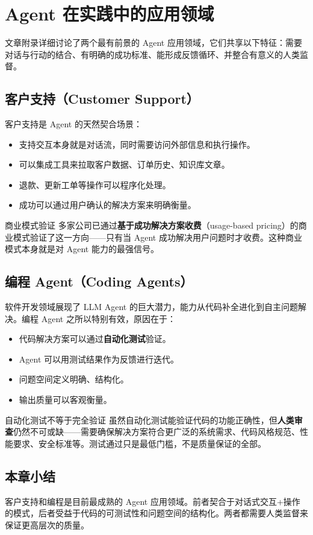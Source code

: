 \section{Agent 在实践中的应用领域}

文章附录详细讨论了两个最有前景的 Agent 应用领域，它们共享以下特征：需要对话与行动的结合、有明确的成功标准、能形成反馈循环、并整合有意义的人类监督。

\subsection{客户支持（Customer Support）}

客户支持是 Agent 的天然契合场景：

\begin{itemize}
    \item 支持交互本身就是对话流，同时需要访问外部信息和执行操作。
    \item 可以集成工具来拉取客户数据、订单历史、知识库文章。
    \item 退款、更新工单等操作可以程序化处理。
    \item 成功可以通过用户确认的解决方案来明确衡量。
\end{itemize}

\begin{knowledgebox}{商业模式验证}
多家公司已通过\textbf{基于成功解决方案收费}（usage-based pricing）的商业模式验证了这一方向——只有当 Agent 成功解决用户问题时才收费。这种商业模式本身就是对 Agent 能力的最强信号。
\end{knowledgebox}

\subsection{编程 Agent（Coding Agents）}

软件开发领域展现了 LLM Agent 的巨大潜力，能力从代码补全进化到自主问题解决。编程 Agent 之所以特别有效，原因在于：

\begin{itemize}
    \item 代码解决方案可以通过\textbf{自动化测试}验证。
    \item Agent 可以用测试结果作为反馈进行迭代。
    \item 问题空间定义明确、结构化。
    \item 输出质量可以客观衡量。
\end{itemize}

\begin{warningbox}{自动化测试不等于完全验证}
虽然自动化测试能验证代码的功能正确性，但\textbf{人类审查}仍然不可或缺——需要确保解决方案符合更广泛的系统需求、代码风格规范、性能要求、安全标准等。测试通过只是最低门槛，不是质量保证的全部。
\end{warningbox}

\subsection{本章小结}
客户支持和编程是目前最成熟的 Agent 应用领域。前者契合于对话式交互+操作的模式，后者受益于代码的可测试性和问题空间的结构化。两者都需要人类监督来保证更高层次的质量。


